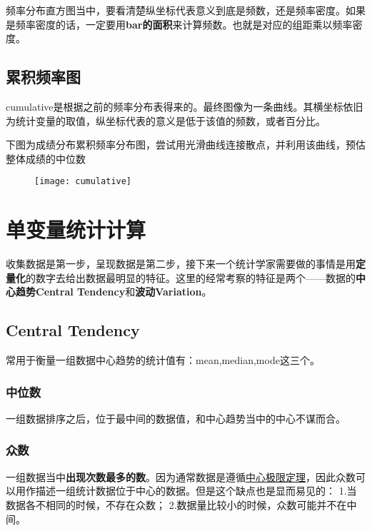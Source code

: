 \begin{SummBox}
频率分布直方图当中，要看清楚纵坐标代表意义到底是频数，还是频率密度。如果是频率密度的话，一定要用\textbf{bar的面积}来计算频数。也就是对应的组距乘以频率密度。
\end{SummBox}
\clearpage

\subsection*{累积频率图}
\gls{cumulative}是根据之前的频率分布表得来的。最终图像为一条曲线。其横坐标依旧为统计变量的取值，纵坐标代表的意义是低于该值的频数，或者百分比。
\begin{TaskBox}
下图为成绩分布累积频率分布图，尝试用光滑曲线连接散点，并利用该曲线，预估整体成绩的中位数
\begin{figure}[H]
\centering
\texttt{[image: cumulative]}
\end{figure}
\end{TaskBox}
\clearpage

\section{单变量统计计算}
收集数据是第一步，呈现数据是第二步，接下来一个统计学家需要做的事情是用\textbf{定量化}的数字去给出数据最明显的特征。这里的经常考察的特征是两个——数据的\textbf{中心趋势Central Tendency}和\textbf{波动Variation}。

\subsection*{Central Tendency}
常用于衡量一组数据中心趋势的统计值有：\gls{mean},\gls{median},\gls{mode}这三个。

\subsubsection*{中位数}
一组数据排序之后，位于最中间的数据值，和中心趋势当中的中心不谋而合。

\subsubsection*{众数}
一组数据当中\textbf{出现次数最多的数}。因为通常数据是遵循\href{https://open.163.com/newview/movie/free?pid=M82IC6GQU&mid=M83JBLPM4}{中心极限定理}，因此众数可以用作描述一组统计数据位于中心的数据。但是这个缺点也是显而易见的：
1.当数据各不相同的时候，不存在众数；
2.数据量比较小的时候，众数可能并不在中间。

